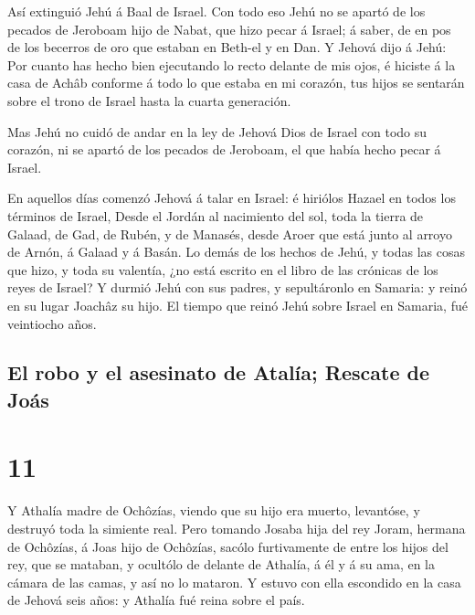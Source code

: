  Así extinguió Jehú á Baal de Israel.  Con
todo eso Jehú no se apartó de los pecados de Jeroboam hijo de Nabat, que
hizo pecar á Israel; á saber, de en pos de los becerros de oro que
estaban en Beth-el y en Dan.  Y Jehová dijo á Jehú: Por
cuanto has hecho bien ejecutando lo recto delante de mis ojos, é hiciste
á la casa de Achâb conforme á todo lo que estaba en mi corazón, tus
hijos se sentarán sobre el trono de Israel hasta la cuarta generación.

 Mas Jehú no cuidó de andar en la ley de Jehová Dios de
Israel con todo su corazón, ni se apartó de los pecados de Jeroboam, el
que había hecho pecar á Israel.

 En aquellos días comenzó Jehová á talar en Israel: é
hiriólos Hazael en todos los términos de Israel,  Desde
el Jordán al nacimiento del sol, toda la tierra de Galaad, de Gad, de
Rubén, y de Manasés, desde Aroer que está junto al arroyo de Arnón, á
Galaad y á Basán.  Lo demás de los hechos de Jehú, y
todas las cosas que hizo, y toda su valentía, ¿no está escrito en el
libro de las crónicas de los reyes de Israel?  Y durmió
Jehú con sus padres, y sepultáronlo en Samaria: y reinó en su lugar
Joachâz su hijo.  El tiempo que reinó Jehú sobre Israel
en Samaria, fué veintiocho años.

\hypertarget{el-robo-y-el-asesinato-de-ataluxeda-rescate-de-jouxe1s}{%
\subsection{El robo y el asesinato de Atalía; Rescate de
Joás}\label{el-robo-y-el-asesinato-de-ataluxeda-rescate-de-jouxe1s}}

\hypertarget{section-10}{%
\section{11}\label{section-10}}

 Y Athalía madre de Ochôzías, viendo que su hijo era
muerto, levantóse, y destruyó toda la simiente real.  Pero
tomando Josaba hija del rey Joram, hermana de Ochôzías, á Joas hijo de
Ochôzías, sacólo furtivamente de entre los hijos del rey, que se
mataban, y ocultólo de delante de Athalía, á él y á su ama, en la cámara
de las camas, y así no lo mataron.  Y estuvo con ella
escondido en la casa de Jehová seis años: y Athalía fué reina sobre el
país.

